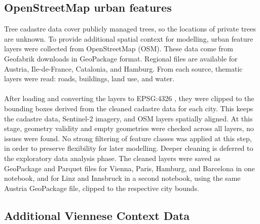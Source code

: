 \subsection{OpenStreetMap urban features}
Tree cadastre data cover publicly managed trees, so the locations of private trees are unknown. To provide additional spatial context for modelling, urban feature layers were collected from OpenStreetMap (OSM). These data come from Geofabrik downloads \cite{geofabrikeurope} in GeoPackage format. Regional files are available for Austria, Ile-de-France, Catalonia, and Hamburg. From each source, thematic layers were read: roads, buildings, land use, and water.\\
\\
After loading and converting the layers to EPSG:4326 \cite{epsg4326}, they were clipped to the bounding boxes derived from the cleaned cadastre data for each city. This keeps the cadastre data, Sentinel-2 imagery, and OSM layers spatially aligned. At this stage, geometry validity and empty geometries were checked across all layers, no issues were found. No strong filtering of feature classes was applied at this step, in order to preserve flexibility for later modelling. Deeper cleaning is deferred to the exploratory data analysis phase. The cleaned layers were saved as GeoPackage and Parquet files for Vienna, Paris, Hamburg, and Barcelona in one notebook, and for Linz and Innsbruck in a second notebook, using the same Austria GeoPackage file, clipped to the respective city bounds.

\subsection{Additional Viennese Context Data}

